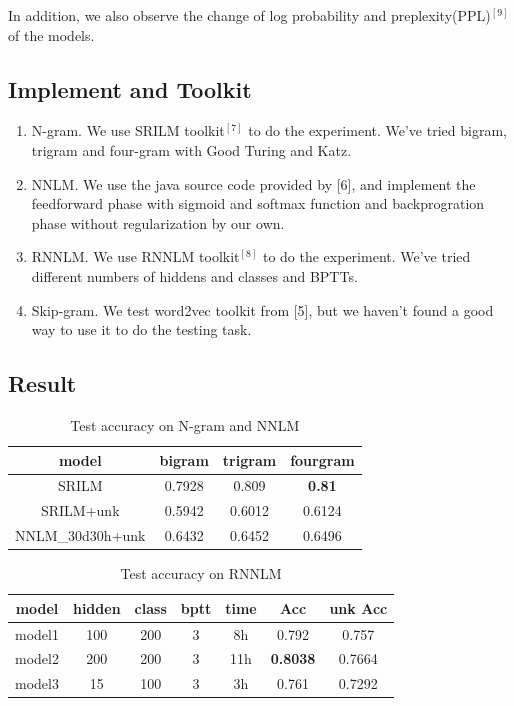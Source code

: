 \documentclass[11pt, oneside]{article}   	%
\begin{document}
In addition, we also observe the change of log probability and preplexity(PPL)$^{[9]}$ of the models.
\subsection{Implement and Toolkit}
\begin{enumerate}
\item N-gram. We use SRILM toolkit$^{[7]}$ to do the experiment. We've tried bigram, trigram and four-gram with Good Turing and Katz.
\item NNLM. We use the java source code provided by [6], and implement the feedforward phase with sigmoid and softmax function and backprogration phase without regularization by our own. 
\item RNNLM. We use RNNLM toolkit$^{[8]}$ to do the experiment. We've tried different numbers of hiddens and classes and BPTTs.
\item Skip-gram. We test word2vec toolkit from [5], but we haven't found a good way to use it to do the testing task.
\end{enumerate}
\subsection{Result}
\begin{table}[h]
\centering
\caption{Test accuracy on N-gram and NNLM }
\begin{tabular}{|c|c|c|c|}
\hline
model         & bigram & trigram & fourgram \\ \hline
SRILM  & 0.7928 & 0.809   & \bf{0.81}     \\ \hline
SRILM+unk          & 0.5942 & 0.6012  & 0.6124   \\ \hline
NNLM\_30d30h+unk & 0.6432 & 0.6452 & 0.6496 \\ \hline
\end{tabular}
\end{table}
\begin{table}[h]
\centering
\caption{Test accuracy on RNNLM}
\label{my-label}
\begin{tabular}{|c|c|c|c|c|c|c|}
\hline
model  & hidden & class & bptt & time & Acc    & unk Acc      \\ \hline
model1 & 100    & 200   & 3    & 8h   & 0.792   & 0.757   \\ \hline
model2 & 200    & 200   & 3    & 11h  & {\bf 0.8038} & 0.7664\\ \hline
model3 & 15     & 100   & 3    & 3h   & 0.761     & 0.7292   \\ \hline
\end{tabular}
\end{table}
\end{document}
